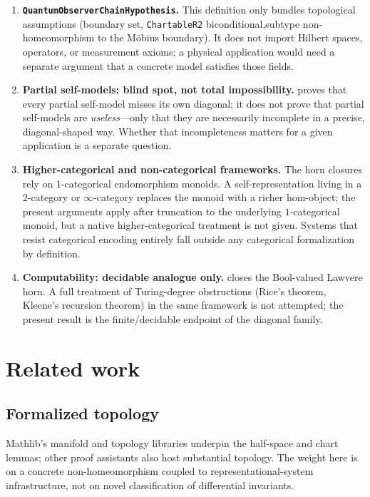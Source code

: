 \documentclass[11pt]{article}
\begin{document}
\begin{enumerate}
\item \textbf{\texttt{QuantumObserverChainHypothesis}.} This definition only
  bundles topological assumptions (boundary set, \texttt{ChartableR2}
  biconditional,\newline subtype non-homeomorphism to the M\"obius boundary). It does not
  import Hilbert spaces, operators, or measurement axioms; a physical
  application would need a separate argument that a concrete model satisfies
  those fields.

\item \textbf{Partial self-models: blind spot, not total impossibility.}
   proves that every partial
  self-model misses its own diagonal; it does not prove that partial
  self-models are \emph{useless}---only that they are necessarily incomplete
  in a precise, diagonal-shaped way.  Whether that incompleteness matters
  for a given application is a separate question.

\item \textbf{Higher-categorical and non-categorical frameworks.}
  The horn closures rely on $1$-categorical endomorphism monoids.  A
  self-representation living in a $2$-category or $\infty$-category
  replaces the monoid with a richer hom-object; the present arguments
  apply after truncation to the underlying $1$-categorical monoid, but
  a native higher-categorical treatment is not given.  Systems that
  resist categorical encoding entirely fall outside any categorical
  formalization by definition.

\item \textbf{Computability: decidable analogue only.}
   closes the
  $\mathrm{Bool}$-valued Lawvere horn.  A full treatment of Turing-degree
  obstructions (Rice's theorem, Kleene's recursion theorem) in the same
  framework is not attempted; the present result is the finite/decidable
  endpoint of the diagonal family.
\end{enumerate}

\section{Related work}
\label{sec:related}

\subsection{Formalized topology}
Mathlib's manifold and topology libraries underpin the half-space and chart
lemmas; other proof assistants also host substantial topology. The weight here is
on a concrete non-homeomorphism coupled to representational-system infrastructure,
not on novel classification of differential invariants.
\end{document}

